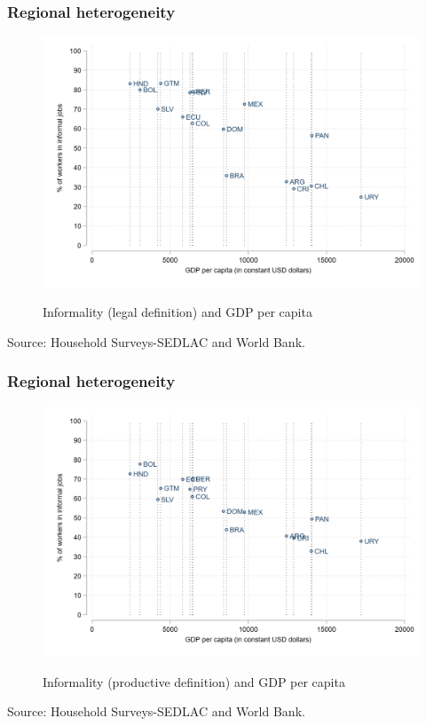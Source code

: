 \documentclass{beamer}
\begin{document}
\begin{frame}
\frametitle{Regional heterogeneity}
\begin{figure}[!htb]
\justifying
  \caption{Informality (legal definition) and GDP per capita}
  \centering
  \includegraphics[width=0.8\linewidth]{latex/figures/Snapshot/GDP vs informal_ss.png}
  \label{fig:GDPinformalSS}
\end{figure}
  \centering
\footnotesize{Source: Household Surveys-SEDLAC and World Bank.}


\end{frame}

\begin{frame}
\frametitle{Regional heterogeneity}
\begin{figure}[!htb]
\justifying
  \caption{Informality (productive definition) and GDP per capita}
  \centering
  \includegraphics[width=0.8\linewidth]{latex/figures/Snapshot/GDP vs informal_pr.png}
  \label{fig:GDPinformalpr}
\end{figure}
  \centering
\footnotesize{Source: Household Surveys-SEDLAC and World Bank.}


\end{frame}
\end{document}
